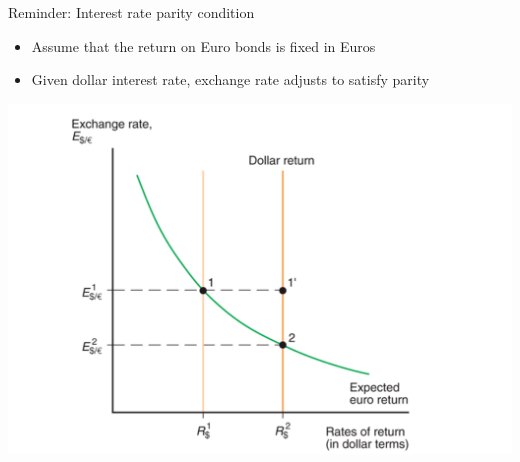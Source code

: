 \documentclass[10pt,hyperref={CJKbookmarks=true},xcolor=dvipsnames,aspectratio=169]{beamer}
\begin{document}

\begin{frame}{Reminder: Interest rate parity condition}

\begin{itemize}
\item Assume that the return on Euro bonds is fixed in Euros
\item Given dollar interest rate, exchange rate adjusts to satisfy parity 
\end{itemize}
\centering
\includegraphics[scale=0.20]{fig/shortrunexchange/interest_rate_parity.png}
\end{frame}
\end{document}
